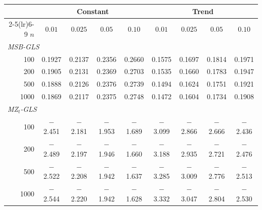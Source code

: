 \begin{tabular}{rcccccccc}
\toprule
& \multicolumn{4}{c}{Constant} & \multicolumn{4}{c}{Trend}\\
\cmidrule(lr){2-5}\cmidrule(lr){6-9}
$n$ & $0.01$ & $0.025$ & $0.05$ & $0.10$ & $0.01$ & $0.025$ & $0.05$ & $0.10$\\
\midrule
\multicolumn{9}{l}{\emph{MSB-GLS}}\\
100 & 0.1927 & 0.2137 & 0.2356 & 0.2660 & 0.1575 & 0.1697 & 0.1814 & 0.1971 \\
200 & 0.1905 & 0.2131 & 0.2369 & 0.2703 & 0.1535 & 0.1660 & 0.1783 & 0.1947 \\
500 & 0.1888 & 0.2126 & 0.2376 & 0.2739 & 0.1494 & 0.1624 & 0.1751 & 0.1921 \\
1000 & 0.1869 & 0.2117 & 0.2375 & 0.2748 & 0.1472 & 0.1604 & 0.1734 & 0.1908 \\
\midrule
\multicolumn{9}{l}{\emph{MZ$_t$-GLS}}\\
100 & $-$2.451 & $-$2.181 & $-$1.953 & $-$1.689 & $-$3.099 & $-$2.866 & $-$2.666 & $-$2.436 \\
200 & $-$2.489 & $-$2.197 & $-$1.946 & $-$1.660 & $-$3.188 & $-$2.935 & $-$2.721 & $-$2.476 \\
500 & $-$2.522 & $-$2.208 & $-$1.942 & $-$1.637 & $-$3.285 & $-$3.009 & $-$2.776 & $-$2.513 \\
1000 & $-$2.544 & $-$2.220 & $-$1.942 & $-$1.628 & $-$3.332 & $-$3.047 & $-$2.804 & $-$2.530 \\
\bottomrule
\end{tabular}
